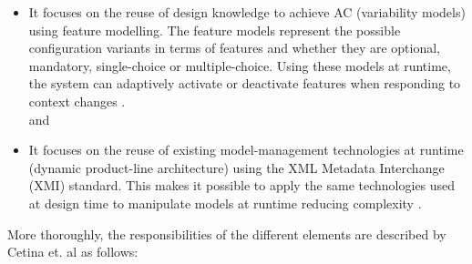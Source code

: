 \documentclass[conference]{IEEEtran}
\begin{document}
\begin{itemize}
	\item It focuses on the reuse of design knowledge to achieve AC (variability models) using feature modelling. The feature models represent the possible configuration variants in terms of features and whether they are optional, mandatory, single-choice or multiple-choice. Using these models at runtime, the system can adaptively activate or deactivate features when responding to context changes \cite{MORE_pdf}.\\

	      and\\

	\item It focuses on the reuse of existing model-management technologies at runtime (dynamic product-line architecture) using the XML Metadata Interchange (XMI) standard. This makes it possible to apply the same technologies used at design time to manipulate models at runtime reducing complexity \cite{MORE_pdf}.\\
\end{itemize}

More thoroughly, the responsibilities of the different elements are described by Cetina et. al as follows:\\
\end{document}
